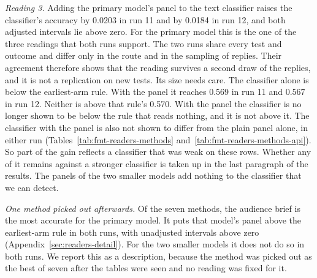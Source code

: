 \emph{Reading 3.} Adding the primary model's panel to the text classifier raises the classifier's accuracy by 0.0203 in run 11 and by 0.0184 in run 12, and both adjusted intervals lie above zero. For the primary model this is the one of the three readings that both runs support. The two runs share every test and outcome and differ only in the route and in the sampling of replies. Their agreement therefore shows that the reading survives a second draw of the replies, and it is not a replication on new tests. Its size needs care. The classifier alone is below the earliest-arm rule. With the panel it reaches 0.569 in run 11 and 0.567 in run 12. Neither is above that rule's 0.570. With the panel the classifier is no longer shown to be below the rule that reads nothing, and it is not above it. The classifier with the panel is also not shown to differ from the plain panel alone, in either run (Tables~\ref{tab:fmt-readers-methods} and~\ref{tab:fmt-readers-methods-api}). So part of the gain reflects a classifier that was weak on these rows. Whether any of it remains against a stronger classifier is taken up in the last paragraph of the results. The panels of the two smaller models add nothing to the classifier that we can detect.

\emph{One method picked out afterwards.} Of the seven methods, the audience brief is the most accurate for the primary model. It puts that model's panel above the earliest-arm rule in both runs, with unadjusted intervals above zero (Appendix~\ref{sec:readers-detail}). For the two smaller models it does not do so in both runs. We report this as a description, because the method was picked out as the best of seven after the tables were seen and no reading was fixed for it.

